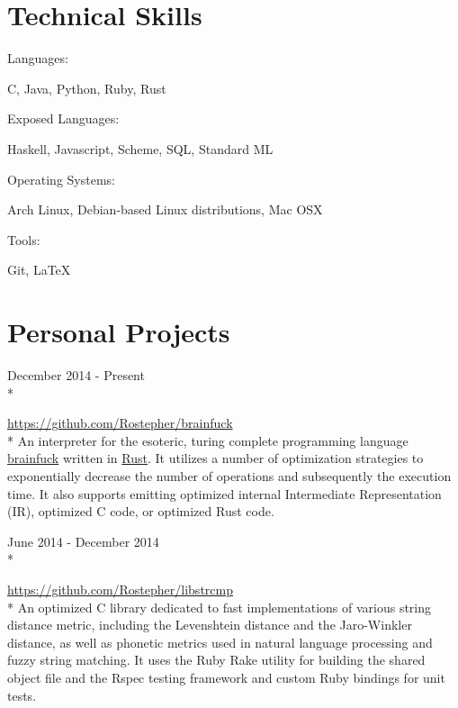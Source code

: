\documentclass[a4paper,margin,line]{resume}
\newcommand{\rurl}[1]{\hfill {\footnotesize \url{#1}}}
\newcommand{\rdate}[1]{\hfill {\small #1}}
\newcommand{\rproject}[4]{\item[#1] \hfill \rdate{#2} \\* \hfill \rdate{#3} \strut\hfill \rurl{#4} \\*}
\begin{document}
\begin{resume}
\section{\mysidestyle Technical Skills}
	\begin{compactdesc}
		\item[Languages: ] \begin{asparablank} { \small
			\item C, Java, Python, Ruby, Rust
		} \end{asparablank}
        \item[Exposed Languages: ] \begin{asparablank}{ \small
            \item Haskell, Javascript, Scheme, SQL, Standard ML
        } \end{asparablank}
		\item[Operating Systems: ] \begin{asparablank} { \small
            \item Arch Linux, Debian-based Linux distributions, Mac OSX
		} \end{asparablank}
		\item[Tools: ] \begin{asparablank} { \small
            \item Git, \LaTeX
		} \end{asparablank}
	\end{compactdesc}

\section{\mysidestyle Personal Projects}
    \begin{asparadesc}
        \rproject{brainfuck}{December 2014 - Present}{}{https://github.com/Rostepher/brainfuck}
        \small
        An interpreter for the esoteric, turing complete programming language \href{https://en.wikipedia.org/wiki/Brainfuck}{brainfuck} written in \href{https://rust-lang.org}{Rust}. It utilizes a number of optimization strategies to exponentially decrease the number of operations and subsequently the execution time. It also supports emitting optimized internal Intermediate Representation (IR), optimized C code, or optimized Rust code.
        \normalsize
        \\

        \rproject{libstrcmp}{June 2014 - December 2014}{}{https://github.com/Rostepher/libstrcmp}
        \small
        An optimized C library dedicated to fast implementations of various string distance metric, including the Levenshtein distance and the Jaro-Winkler distance, as well as phonetic metrics used in natural language processing and fuzzy string matching. It uses the Ruby Rake utility for building the shared object file and the Rspec testing framework and custom Ruby bindings for unit tests.
        \normalsize
        \\


\end{asparadesc}
\end{resume}
\end{document}
